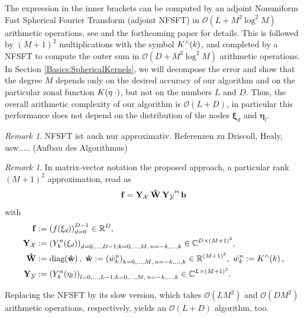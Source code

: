 \documentclass[11pt,a4paper,twoside,bibtotoc]{scrartcl}
\theoremstyle{plain}
\theoremstyle{definition}
\theoremstyle{remark}
\newtheorem{remark}[theorem]{Remark}
\newcommand{\adj}{{\vdash \hspace*{-1.72mm} \dashv}}
\newcommand{\R}{\ensuremath{\mathbb{R}}}
\newcommand{\C}{\ensuremath{\mathbb{C}}}
\newcommand{\fun}[2]{\ensuremath{#1{\hspace{-0.4ex}}\left(#2\right)}}
\newcommand{\paren}[1]{\ensuremath{\left(#1\right)}}
\newcommand{\mb}[1]{\mathbf{#1}}
\newcommand{\V}[1]{\mb{#1}}
\newcommand{\diag}{\text{\rm{diag}}}
\numberwithin{equation}{section}
\numberwithin{table}{section}
\numberwithin{figure}{section}
\begin{document}
The expression in the inner brackets can be computed by an adjoint Nonuniform
Fast Spherical Fourier Transform (adjoint NFSFT) in 
$\mathcal{O}(L + M^2 \log^2 M)$
arithmetic operations, see \cite{xxx} and the forthcoming paper \cite{xxx} for
details.
This is followed by $(M+1)^2$ multiplications with the symbol
$\fun{K^{\wedge}}{k}$, and completed by a NFSFT to compute the outer sum in
$\mathcal{O}(D + M^2 \log^2 M)$ arithmetic operations.
In Section \ref{Basics:SphericalKernels}, we will decompose the error and show
that the degree $M$ depends only on the desired accuracy of our algorithm and
on the particular zonal function $\fun{K}{\V{\eta} \: \cdot}$, but not on the
numbers $L$ and $D$.
Thus, the overall arithmetic complexity of our algorithm is $\mathcal{O}(L +
D)$, in particular this performance does not depend on the distribution of the
nodes $\V{\xi}_{d}$ and $\V{\eta}_{l}$.

\begin{remark}
  NFSFT ist auch nur approximativ. Referenzen zu Driscoll, Healy, usw..... 
  (Aufbau des Algorithmus)
\end{remark}

\begin{remark}
In matrix-vector notation the proposed approach, a particular rank $(M+1)^2$
approximation, read as
\[
  \V{f} = \V{Y_{\mathcal{X}}} \: \V{\hat W} \:
  \V{Y_{\mathcal{Y}}}^{\adj} \: \V{b}
\]
with
\begin{align}
  \nonumber
  \V{f} & := \paren{\fun{f}{\V{\xi}_{d}}}_{d=0}^{D-1} \in \R^D,
  \\ \nonumber
  \V{Y_{\mathcal{X}}} & := \paren{\fun{Y_k^n}{\V{\xi}_{d}}}_{d=0,\ldots,D-1;
  k=0,\ldots,M,\:n=-k,\ldots,k} \in \C^{D \times
  \paren{M+1}^2}, \\ \nonumber
  \V{\hat W} & := \fun{\diag}{\V{\hat w}},\ \V{\hat w} := \paren{\hat
  w_{k}^{n}}_{k=0,\ldots,M,\:n=-k,\ldots,k} \in \R^{(M+1)^2},\ \hat w_{k}^n :=
  \fun{K^{\wedge}}{k}, \\ \nonumber
  \V{Y_{\mathcal{Y}}} & := \paren{\fun{Y_k^n}{\V{\eta}_{l}}}_{l=0,\ldots,L-1;
  k=0,\ldots,M,\:n=-k,\ldots,k} \in \C^{L \times \paren{M+1}^2}.
\end{align}

Replacing the NFSFT by its slow version, which takes $\mathcal{O}(L M^2)$ and
$\mathcal{O}(D M^2)$ arithmetic operations, respectively, yields an
$\mathcal{O}(L+D)$ algorithm, too.
\end{remark}
\end{document}

